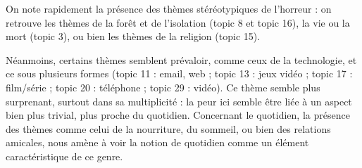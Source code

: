 \documentclass[a4paper,12pt,onecolumn,oneside]{article}
\begin{document}
On note rapidement la présence des thèmes stéréotypiques de l'horreur : on retrouve les thèmes de la forêt et de l'isolation (topic 8 et topic 16), la vie ou la mort (topic 3), ou bien les thèmes de la religion (topic 15).

Néanmoins, certains thèmes semblent prévaloir, comme ceux de la technologie, et ce sous plusieurs formes (topic 11 : email, web ; topic 13 : jeux vidéo ; topic 17 : film/série ; topic 20 : téléphone ; topic 29 : vidéo). Ce thème semble plus surprenant, surtout dans sa multiplicité : la peur ici semble être liée à un aspect bien plus trivial, plus proche du quotidien.
Concernant le quotidien, la présence des thèmes comme celui de la nourriture, du sommeil, ou bien des relations amicales, nous amène à voir la notion de quotidien comme un élément caractéristique de ce genre.
\end{document}
